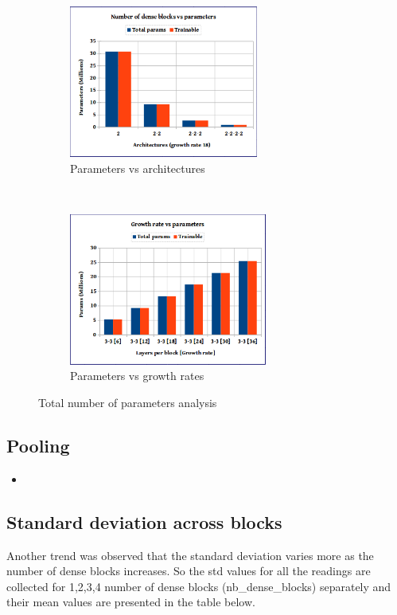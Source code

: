 \begin{figure}
    \centering
    \begin{subfigure}[b]{0.4\textwidth}
        \includegraphics[height=5cm]{images/densenet/Denseblocks_vs_parameters}
        \caption{Parameters vs architectures}
        \label{fig:Denseblocks_vs_parameters}
    \end{subfigure}
    ~ %
    \begin{subfigure}[b]{0.4\textwidth}
        \includegraphics[height=5cm]{images/densenet/growthrate_vs_parameters}
        \caption{Parameters vs growth rates}
        \label{fig:growthrate_vs_parameters}
    \end{subfigure}    
    \caption{Total number of parameters analysis}\label{fig:total_parameters_densenet}
\end{figure}

\subsection{Pooling}
\begin{itemize}
 \item 
\end{itemize}


\subsection{Standard deviation across blocks}
Another trend was observed that the standard deviation varies more as the number of dense blocks increases. 
So the std values for all the readings are collected for 1,2,3,4 number of dense blocks (nb\_dense\_blocks) separately and their mean values are presented in the table below.

